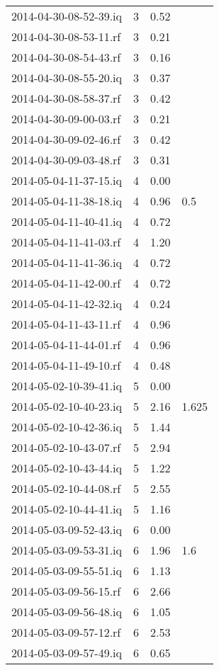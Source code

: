 \begin{center}
\begin{longtable}{@{}l l l l@{}}
		2014-04-30-08-52-39.iq & 3 & 0.52 &  \\ 
		2014-04-30-08-53-11.rf & 3 & 0.21 &  \\ 
		2014-04-30-08-54-43.rf & 3 & 0.16 &  \\ 
		2014-04-30-08-55-20.iq & 3 & 0.37 &  \\ 
		2014-04-30-08-58-37.rf & 3 & 0.42 &  \\ 
		2014-04-30-09-00-03.rf & 3 & 0.21 &  \\ 
		2014-04-30-09-02-46.rf & 3 & 0.42 &  \\ 
		2014-04-30-09-03-48.rf & 3 & 0.31 &  \\ 
		2014-05-04-11-37-15.iq & 4 & 0.00 &  \\ 
		2014-05-04-11-38-18.iq & 4 & 0.96 & 0.5 \\ 
		2014-05-04-11-40-41.iq & 4 & 0.72 &  \\ 
		2014-05-04-11-41-03.rf & 4 & 1.20 &  \\ 
		2014-05-04-11-41-36.iq & 4 & 0.72 &  \\ 
		2014-05-04-11-42-00.rf & 4 & 0.72 &  \\ 
		2014-05-04-11-42-32.iq & 4 & 0.24 &  \\ 
		2014-05-04-11-43-11.rf & 4 & 0.96 &  \\ 
		2014-05-04-11-44-01.rf & 4 & 0.96 &  \\ 
		2014-05-04-11-49-10.rf & 4 & 0.48 &  \\ 
		2014-05-02-10-39-41.iq & 5 & 0.00 &  \\ 
		2014-05-02-10-40-23.iq & 5 & 2.16 & 1.625 \\ 
		2014-05-02-10-42-36.iq & 5 & 1.44 &  \\ 
		2014-05-02-10-43-07.rf & 5 & 2.94 &  \\ 
		2014-05-02-10-43-44.iq & 5 & 1.22 &  \\ 
		2014-05-02-10-44-08.rf & 5 & 2.55 &  \\ 
		2014-05-02-10-44-41.iq & 5 & 1.16 &  \\ 
		2014-05-03-09-52-43.iq & 6 & 0.00 &  \\ 
		2014-05-03-09-53-31.iq & 6 & 1.96 & 1.6 \\ 
		2014-05-03-09-55-51.iq & 6 & 1.13 &  \\ 
		2014-05-03-09-56-15.rf & 6 & 2.66 &  \\ 
		2014-05-03-09-56-48.iq & 6 & 1.05 &  \\ 
		2014-05-03-09-57-12.rf & 6 & 2.53 &  \\ 
		2014-05-03-09-57-49.iq & 6 & 0.65 &  \\ 

\end{longtable}
\end{center}
